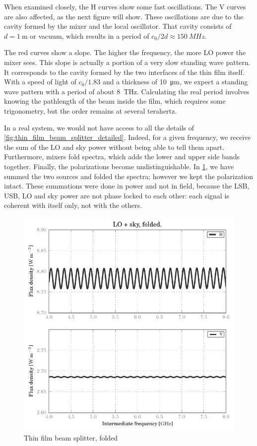 When examined closely, the H curves show some fast oscillations.
The V curves are also affected, as the next figure will show.
These oscillations are due to the cavity formed by the mixer and the local oscillator.
That cavity consists of $d=\SI{1}{\meter}$ or vacuum, which results in a period of $c_0 / 2d \approx \SI{150}{MHz}$.

The red curves show a slope.
The higher the frequency, the more LO power the mixer sees.
This slope is actually a portion of a very slow standing wave pattern.
It corresponds to the cavity formed by the two interfaces of the thin film itself.
With a speed of light of $c_0 / 1.83$ and a thickness of \SI{10}{\micro\meter}, we expect a standing wave pattern with a period of about \SI{8}{\tera\hertz}.
Calculating the real period involves knowing the pathlength of the beam inside the film, which requires some trigonometry, but the order remains at several terahertz.

In a real system, we would not have access to all the details of \cref{fig:thin_film_beam_splitter_detailed}.
Indeed, for a given frequency, we receive the sum of the LO and sky power without being able to tell them apart.
Furthermore, mixers fold spectra, which adds the lower and upper side bands together.
Finally, the polarizations become undistinguishable.
In \cref{fig:thin_film_beam_splitter_folded}, we have summed the two sources and folded the spectra; however we kept the polarization intact.
These summations were done in power and not in field, because the LSB, USB, LO and sky power are not phase locked to each other: each signal is coherent with itself only, not with the others.

\begin{figure}[hbtp]
    \centering
    \includegraphics{thin_film_beam_splitter_folded}
    \caption{Thin film beam splitter, folded}
    \label{fig:thin_film_beam_splitter_folded}
\end{figure}

